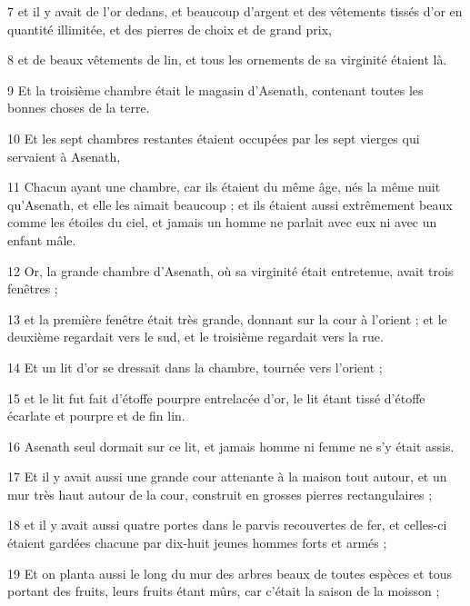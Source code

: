 \par 7 et il y avait de l'or dedans, et beaucoup d'argent et des vêtements tissés d'or en quantité illimitée, et des pierres de choix et de grand prix,

\par 8 et de beaux vêtements de lin, et tous les ornements de sa virginité étaient là.

\par 9 Et la troisième chambre était le magasin d'Asenath, contenant toutes les bonnes choses de la terre.

\par 10 Et les sept chambres restantes étaient occupées par les sept vierges qui servaient à Asenath,

\par 11 Chacun ayant une chambre, car ils étaient du même âge, nés la même nuit qu'Asenath, et elle les aimait beaucoup ; et ils étaient aussi extrêmement beaux comme les étoiles du ciel, et jamais un homme ne parlait avec eux ni avec un enfant mâle.

\par 12 Or, la grande chambre d'Asenath, où sa virginité était entretenue, avait trois fenêtres ;

\par 13 et la première fenêtre était très grande, donnant sur la cour à l'orient ; et le deuxième regardait vers le sud, et le troisième regardait vers la rue.

\par 14 Et un lit d'or se dressait dans la chambre, tournée vers l'orient ;

\par 15 et le lit fut fait d'étoffe pourpre entrelacée d'or, le lit étant tissé d'étoffe écarlate et pourpre et de fin lin.

\par 16 Asenath seul dormait sur ce lit, et jamais homme ni femme ne s'y était assis.

\par 17 Et il y avait aussi une grande cour attenante à la maison tout autour, et un mur très haut autour de la cour, construit en grosses pierres rectangulaires ;

\par 18 et il y avait aussi quatre portes dans le parvis recouvertes de fer, et celles-ci étaient gardées chacune par dix-huit jeunes hommes forts et armés ;

\par 19 Et on planta aussi le long du mur des arbres beaux de toutes espèces et tous portant des fruits, leurs fruits étant mûrs, car c'était la saison de la moisson ;

